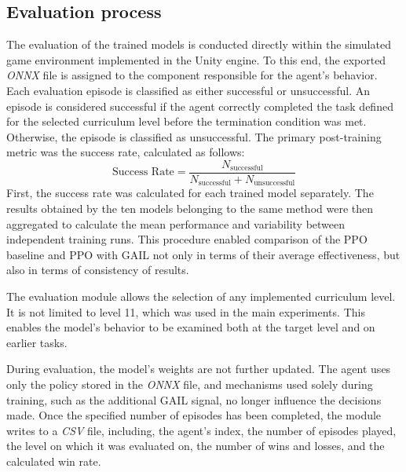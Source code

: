 \subsection{Evaluation process}
The evaluation of the trained models is conducted directly within the simulated game environment implemented in the Unity engine. To this end, the exported \textit{ONNX} file is assigned to the component responsible for the agent’s behavior. 
Each evaluation episode is classified as either successful or unsuccessful. An episode is considered successful if the agent correctly completed the task defined for the selected curriculum level before the termination condition was met. Otherwise, the episode is classified as unsuccessful. The primary post-training metric was the success rate, calculated as follows:
\begin{equation}
	\text{Success Rate} = \frac{N_{\text{successful}}}{N_{\text{successful}} + N_{\text{unsuccessful}}}
\end{equation}
First, the success rate was calculated for each trained model separately. The results obtained by the ten models belonging to the same method were then aggregated to calculate the mean performance and variability between independent training runs. This procedure enabled comparison of the PPO baseline and PPO with GAIL not only in terms of their average effectiveness, but also in terms of consistency of results.
 
The evaluation module allows the selection of any implemented curriculum level. It is not limited to level 11, which was used in the main experiments. This enables the model’s behavior to be examined both at the target level and on earlier tasks.

During evaluation, the model’s weights are not further updated. The agent uses only the policy stored in the \textit{ONNX} file, and mechanisms used solely during training, such as the additional GAIL signal, no longer influence the decisions made. Once the specified number of episodes has been completed, the module writes to a \textit{CSV} file, including, the agent’s index, the number of episodes played, the level on which it was evaluated on, the number of wins and losses, and the calculated win rate.

